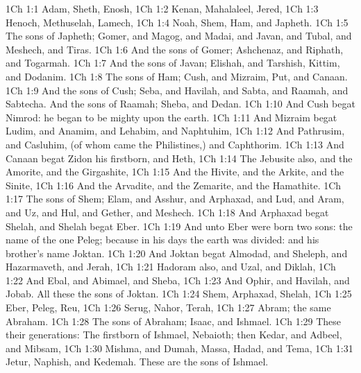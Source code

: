 \vs 1Ch 1:1 Adam, Sheth, Enosh,
\vs 1Ch 1:2 Kenan, Mahalaleel, Jered,
\vs 1Ch 1:3 Henoch, Methuselah, Lamech,
\vs 1Ch 1:4 Noah, Shem, Ham, and Japheth.
\vs 1Ch 1:5 The sons of Japheth; Gomer, and Magog, and Madai, and Javan, and Tubal, and Meshech, and Tiras.
\vs 1Ch 1:6 And the sons of Gomer; Ashchenaz, and Riphath, and Togarmah.
\vs 1Ch 1:7 And the sons of Javan; Elishah, and Tarshish, Kittim, and Dodanim.
\vs 1Ch 1:8 The sons of Ham; Cush, and Mizraim, Put, and Canaan.
\vs 1Ch 1:9 And the sons of Cush; Seba, and Havilah, and Sabta, and Raamah, and Sabtecha. And the sons of Raamah; Sheba, and Dedan.
\vs 1Ch 1:10 And Cush begat Nimrod: he began to be mighty upon the earth.
\vs 1Ch 1:11 And Mizraim begat Ludim, and Anamim, and Lehabim, and Naphtuhim,
\vs 1Ch 1:12 And Pathrusim, and Casluhim, (of whom came the Philistines,) and Caphthorim.
\vs 1Ch 1:13 And Canaan begat Zidon his firstborn, and Heth,
\vs 1Ch 1:14 The Jebusite also, and the Amorite, and the Girgashite,
\vs 1Ch 1:15 And the Hivite, and the Arkite, and the Sinite,
\vs 1Ch 1:16 And the Arvadite, and the Zemarite, and the Hamathite.
\vs 1Ch 1:17 The sons of Shem; Elam, and Asshur, and Arphaxad, and Lud, and Aram, and Uz, and Hul, and Gether, and Meshech.
\vs 1Ch 1:18 And Arphaxad begat Shelah, and Shelah begat Eber.
\vs 1Ch 1:19 And unto Eber were born two sons: the name of the one  Peleg; because in his days the earth was divided: and his brother's name  Joktan.
\vs 1Ch 1:20 And Joktan begat Almodad, and Sheleph, and Hazarmaveth, and Jerah,
\vs 1Ch 1:21 Hadoram also, and Uzal, and Diklah,
\vs 1Ch 1:22 And Ebal, and Abimael, and Sheba,
\vs 1Ch 1:23 And Ophir, and Havilah, and Jobab. All these  the sons of Joktan.
\vs 1Ch 1:24 Shem, Arphaxad, Shelah,
\vs 1Ch 1:25 Eber, Peleg, Reu,
\vs 1Ch 1:26 Serug, Nahor, Terah,
\vs 1Ch 1:27 Abram; the same  Abraham.
\vs 1Ch 1:28 The sons of Abraham; Isaac, and Ishmael.
\vs 1Ch 1:29 These  their generations: The firstborn of Ishmael, Nebaioth; then Kedar, and Adbeel, and Mibsam,
\vs 1Ch 1:30 Mishma, and Dumah, Massa, Hadad, and Tema,
\vs 1Ch 1:31 Jetur, Naphish, and Kedemah. These are the sons of Ishmael.
